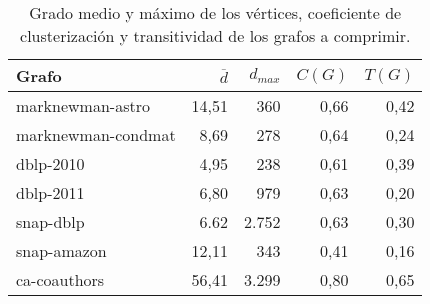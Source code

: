 \begin{table}
	\caption{Grado medio y máximo de los vértices, coeficiente de clusterización y transitividad de los grafos a comprimir.}
	\label{table:gafros2}
	\centering
	\begin{tabular}{l|r|r|r|r}
		\toprule
		Grafo & $\overline{d}$ & $d_{max}$ & $C(G)$ & $T(G)$ \\
		\midrule
		marknewman-astro & 14,51 & 360 & 0,66 & 0,42 \\
		marknewman-condmat & 8,69 & 278 & 0,64 & 0,24 \\
		dblp-2010 & 4,95 & 238 & 0,61 & 0,39 \\
         dblp-2011 & 6,80 & 979 & 0,63 & 0,20 \\
		snap-dblp & 6.62 & 2.752 & 0,63 & 0,30 \\
         snap-amazon & 12,11 & 343 & 0,41 & 0,16 \\
         ca-coauthors & 56,41 & 3.299 & 0,80 & 0,65 \\
         \bottomrule
	\end{tabular}
\end{table}
